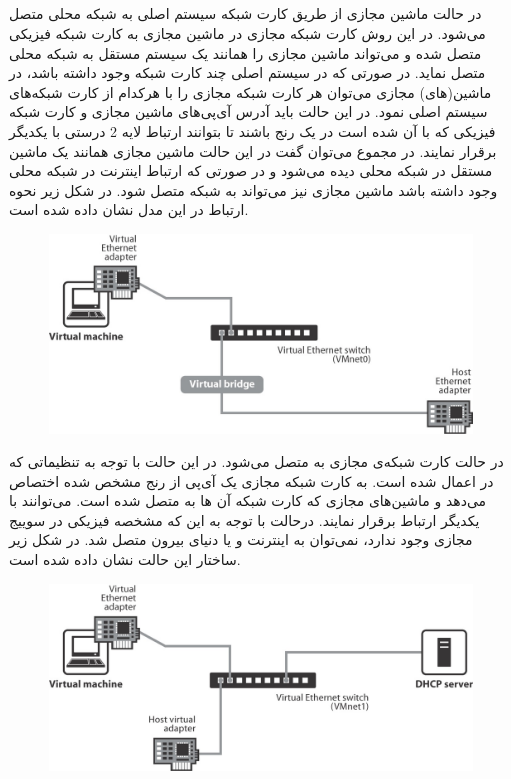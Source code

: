 \documentclass{article}
\begin{document}
\subsection{}
در حالت  ماشین مجازی از طریق کارت شبکه سیستم اصلی به شبکه محلی متصل می‌شود. در این روش کارت شبکه مجازی در ماشین مجازی به کارت شبکه فیزیکی متصل شده و می‌تواند ماشین مجازی را همانند یک سیستم مستقل به شبکه محلی متصل نماید. در صورتی که در سیستم اصلی چند کارت شبکه وجود داشته باشد، در ماشین(های) مجازی می‌توان هر کارت شبکه مجازی را با هرکدام از کارت شبکه‌های سیستم اصلی  نمود. در این حالت باید آدرس آی‌پی‌های ماشین مجازی و کارت شبکه فیزیکی که با آن  شده است در یک رنج باشند تا بتوانند ارتباط لایه 2 درستی با یکدیگر برقرار نمایند. در مجموع می‌توان گفت در این حالت ماشین مجازی همانند یک ماشین مستقل در شبکه محلی دیده می‌شود و در صورتی که ارتباط اینترنت در شبکه محلی وجود داشته باشد ماشین مجازی نیز می‌تواند به شبکه متصل شود. در شکل زیر نحوه ارتباط در این مدل نشان داده شده است.
\begin{figure}[H]
    \centering
    \includegraphics[width=1.0\textwidth]{figures/7a.jpg}
    \caption
	{
	}
    \label{fig:fig1}
\end{figure}
در حالت  کارت شبکه‌ی مجازی به  متصل می‌شود. در این حالت با
توجه به تنظیماتی که در  اعمال شده است.  به کارت شبکه مجازی
یک آی‌پی از رنج مشخص شده اختصاص می‌دهد و ماشین‌های مجازی که کارت شبکه آن ها به  متصل شده است. می‌توانند با یکدیگر ارتباط برقرار نمایند. درحالت  با توجه به این که مشخصه فیزیکی در سوییج مجازی  وجود ندارد، نمی‌توان به اینترنت و یا دنیای بیرون  متصل شد. در شکل زیر ساختار این حالت نشان داده شده است.
\begin{figure}[H]
    \centering
    \includegraphics[width=1.0\textwidth]{figures/7b.jpg}
    \caption
	{
	}
    \label{fig:fig1}
\end{figure}
\end{document}
